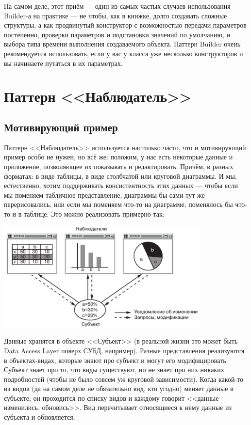 \documentclass{../../text-style}
\begin{document}
На самом деле, этот приём --- один из самых частых случаев использования Builder-а на практике --- не чтобы, как в книжке, долго создавать сложные структуры, а как продвинутый конструктор с возможностью передачи параметров постепенно, проверки параметров и подстановки значений по умолчанию, и выбора типа времени выполнения создаваемого объекта. Паттерн Builder очень рекомендуется использовать, если у вас у класса уже несколько конструкторов и вы начинаете путаться в их параметрах.

\section{Паттерн <<Наблюдатель>>}

\subsection{Мотивирующий пример}

Паттерн <<Наблюдатель>> используется настолько часто, что и мотивирующий пример особо не нужен, но всё же: положим, у нас есть некоторые данные и приложение, позволяющее их показывать и редактировать. Причём, в разных форматах: в виде таблицы, в виде столбчатой или круговой диаграммы. И мы, естественно, хотим поддерживать консистентность этих данных --- чтобы если мы поменяем табличное представление, диаграммы бы сами тут же перерисовались, или если мы поменяем что-то на диаграмме, поменялось бы что-то и в таблице. Это можно реализовать примерно так:

\begin{center}
    \includegraphics[width=0.8\textwidth]{observerExample.png}
\end{center}

Данные хранятся в объекте <<Субъект>> (в реальной жизни это может быть Data Access Layer поверх СУБД, например). Разные представления реализуются в объектах-видах, которые знают про субъект и могут его модифицировать. Субъект знает про то, что виды существуют, но не знает про них никаких подробностей (чтобы не было совсем уж круговой зависимости). Когда какой-то из видов (да на самом деле не обязательно вид, кто угодно) меняет данные в субъекте, он проходится по списку видов и каждому говорит <<данные изменились, обновись>>. Вид перечитывает относящиеся к нему данные из субъекта и обновляется.
\end{document}
